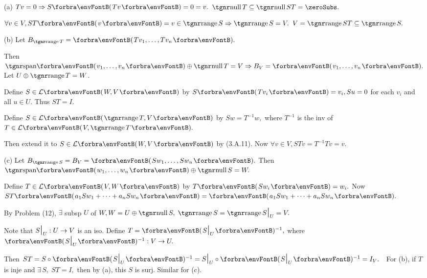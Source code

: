 \par\quad
(a) $Tv=0\Rightarrow S\Par{Tv}=0=v.$ \Or $\null T\subseteq\null ST=\zeroSubs.$\par\quad\Ha
$\forall v\in V,ST\Par{v}=v\in\range S\Rightarrow \range S=V.$ \Or $V=\range ST\subseteq\range S.$\par\vspace{4pt}\quad
(b)  \;Let $B_{\range T}=\Par{Tv_1,\dots,Tv_n}.$\par\quad\Hb
Then $\Span{v_1,\dots,v_n}\oplus\null T=V\Rightarrow B_V=\Par{v_1,\dots,v_n}.$ Let $U\oplus\range T=W$.\par\quad\Hb
Define $S\in\Lm{W,V}$ by $S\Par{Tv_i}=v_i,Su=0$ for each $v_i$ and all $u\in U.$ Thus $ST=I.$\par\vspace{4pt}\quad\Hb
\Or Define $S\in\Lm{\range T,V}$ by $Sw=T^{-1}w,$ {where $T^{-1}$ is the inv of $T\in\Lm{V,\range T}.$}\par\quad\Hb
Then extend it to $S\in\Lm{W,V}$ by (3.A.11). Now $\forall v\in V,STv=T^{-1}Tv=v.$\par\vspace{6pt}\quad
(c)  \;Let $B_{\range S}=B_{V}=\Par{Sw_1,\dots,Sw_n}.$ Then $\Span{w_1,\dots,w_n}\oplus\null S=W.$\par\quad\Hc
Define $T\in\Lm{V,W}$ by $T\Par{Sw_i}=w_i.$ Now $ST\Par{a_1Sw_1+\dots+a_nSw_n}=\Par{a_1Sw_1+\dots+a_nSw_n}.$\par\vspace{4pt}\quad\Hc
\Or By Problem (12), $\exists$ subsp $U$ of $W,W=U\oplus\null S,\;\range S=\range S\mmid_U=V.$\par\quad\Hc
Note that $S\text{\Large|}_U:U\rightarrow V$ is an iso. Define $T=\Par{S\mmid_U}{^{-1}},$ where $\Par{S\mmid_U}{^{-1}}:V\rightarrow U.$\par\quad\Hc
Then $ST=S\circ\Par{S\mmid_U}{^{-1}}=S\mmid_U\circ\Par{S\mmid_U}{^{-1}}=I_V.$\PfEnd\vspace{4pt}
\Corollary \,\,\,For (b), if $T$ is inje and $\exists\,S,\;ST=I,$ then by (a), this $S$ is surj. Similar for (c).
\SepLine

